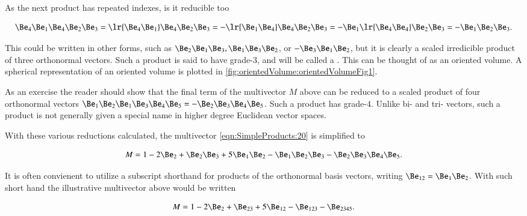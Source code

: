 As the next product has repeated indexes, is it reducible too

\begin{dmath}\label{eqn:SimpleProducts:100}
\Be_4 \Be_1 \Be_4 \Be_2 \Be_3
=
\lr{ \Be_4 \Be_1} \Be_4 \Be_2 \Be_3
=
-\lr{ \Be_1 \Be_4} \Be_4 \Be_2 \Be_3
=
- \Be_1 \lr{ \Be_4 \Be_4 } \Be_2 \Be_3
=
- \Be_1 \Be_2 \Be_3.
\end{dmath}

This could be written in other forms, such as \( \Be_2 \Be_1 \Be_3, \Be_1 \Be_3 \Be_2 \), or \( -\Be_3 \Be_1 \Be_2 \), but it is clearly a scaled irredicible product of three orthonormal vectors.  Such a product is said to have grade-3, and will be called a .  This can be thought of as an oriented volume.
A spherical representation of an oriented volume is plotted in \cref{fig:orientedVolume:orientedVolumeFig1}.

As an exercise the reader should show that the final term of the multivector \( M \) above can be reduced to a scaled product of four orthonormal vectors \( \Be_1 \Be_2 \Be_1 \Be_3 \Be_4 \Be_5 = -\Be_2 \Be_3 \Be_4 \Be_5 \).  Such a product has grade-4.  Unlike bi- and tri- vectors, such a product is not generally given a special name in higher degree Euclidean vector spaces.

With these various reductions calculated, the multivector \cref{eqn:SimpleProducts:20} is simplified to

\begin{dmath}\label{eqn:SimpleProducts:120}
M = 1 - 2 \Be_2  + \Be_2 \Be_3 + 5 \Be_1 \Be_2 - \Be_1 \Be_2 \Be_3 -\Be_2 \Be_3 \Be_4 \Be_5.
\end{dmath}

It is often convienent to utilize a subscript shorthand for products of the orthonormal basis vectors, writing \( \Be_{12} = \Be_1 \Be_2 \).  With such short hand the illustrative multivector above would be written

\begin{dmath}\label{eqn:SimpleProducts:130}
M = 1 - 2 \Be_2  + \Be_{23} + 5 \Be_{12} - \Be_{123} -\Be_{2345}.
\end{dmath}

